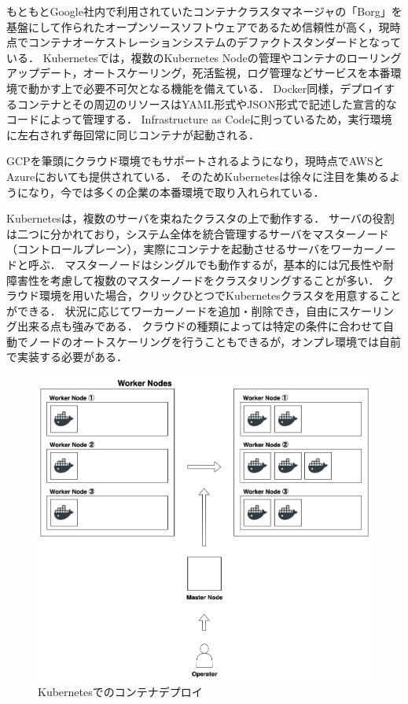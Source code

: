 もともとGoogle社内で利用されていたコンテナクラスタマネージャの「Borg」を基盤にして作られたオープンソースソフトウェアであるため信頼性が高く，現時点でコンテナオーケストレーションシステムのデファクトスタンダードとなっている．
Kubernetesでは，複数のKubernetes Nodeの管理やコンテナのローリングアップデート，オートスケーリング，死活監視，ログ管理などサービスを本番環境で動かす上で必要不可欠となる機能を備えている．
Docker同様，デプロイするコンテナとその周辺のリソースはYAML形式やJSON形式で記述した宣言的なコードによって管理する．
Infrastructure as Codeに則っているため，実行環境に左右されず毎回常に同じコンテナが起動される．

GCPを筆頭にクラウド環境でもサポートされるようになり，現時点でAWSとAzureにおいても提供されている．
そのためKubernetesは徐々に注目を集めるようになり，今では多くの企業の本番環境で取り入れられている．

Kubernetesは，複数のサーバを束ねたクラスタの上で動作する．
サーバの役割は二つに分かれており，システム全体を統合管理するサーバをマスターノード（コントロールプレーン），実際にコンテナを起動させるサーバをワーカーノードと呼ぶ．
マスターノードはシングルでも動作するが，基本的には冗長性や耐障害性を考慮して複数のマスターノードをクラスタリングすることが多い．
クラウド環境を用いた場合，クリックひとつでKubernetesクラスタを用意することができる．
状況に応じてワーカーノードを追加・削除でき，自由にスケーリング出来る点も強みである．
クラウドの種類によっては特定の条件に合わせて自動でノードのオートスケーリングを行うこともできるが，オンプレ環境では自前で実装する必要がある．

\begin{figure}[htbp]
\begin{center}
    \includegraphics[width=\textwidth]{./figures/k8s-deploy-container.jpg}
    \caption{Kubernetesでのコンテナデプロイ}
\end{center}
\end{figure}

